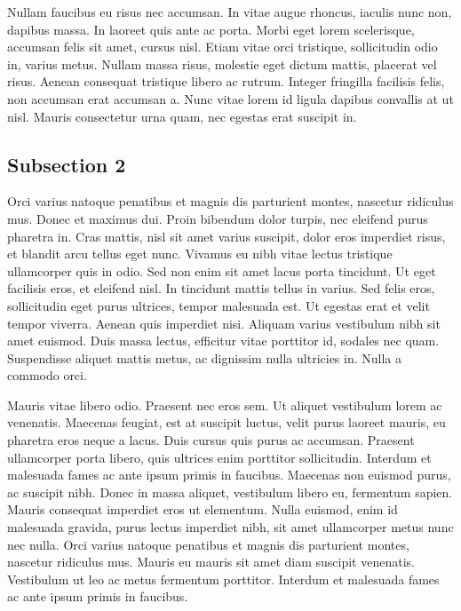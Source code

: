 Nullam faucibus eu risus nec accumsan. In vitae augue rhoncus, iaculis nunc non, dapibus massa. In laoreet quis ante ac porta. Morbi eget lorem scelerisque, accumsan felis sit amet, cursus nisl. Etiam vitae orci tristique, sollicitudin odio in, varius metus. Nullam massa risus, molestie eget dictum mattis, placerat vel risus. Aenean consequat tristique libero ac rutrum. Integer fringilla facilisis felis, non accumsan erat accumsan a. Nunc vitae lorem id ligula dapibus convallis at ut nisl. Mauris consectetur urna quam, nec egestas erat suscipit in.

\subsection{Subsection 2}

Orci varius natoque penatibus et magnis dis parturient montes, nascetur ridiculus mus. Donec et maximus dui. Proin bibendum dolor turpis, nec eleifend purus pharetra in. Cras mattis, nisl sit amet varius suscipit, dolor eros imperdiet risus, et blandit arcu tellus eget nunc. Vivamus eu nibh vitae lectus tristique ullamcorper quis in odio. Sed non enim sit amet lacus porta tincidunt. Ut eget facilisis eros, et eleifend nisl. In tincidunt mattis tellus in varius. Sed felis eros, sollicitudin eget purus ultrices, tempor malesuada est. Ut egestas erat et velit tempor viverra. Aenean quis imperdiet nisi. Aliquam varius vestibulum nibh sit amet euismod. Duis massa lectus, efficitur vitae porttitor id, sodales nec quam. Suspendisse aliquet mattis metus, ac dignissim nulla ultricies in. Nulla a commodo orci.

Mauris vitae libero odio. Praesent nec eros sem. Ut aliquet vestibulum lorem ac venenatis. Maecenas feugiat, est at suscipit luctus, velit purus laoreet mauris, eu pharetra eros neque a lacus. Duis cursus quis purus ac accumsan. Praesent ullamcorper porta libero, quis ultrices enim porttitor sollicitudin. Interdum et malesuada fames ac ante ipsum primis in faucibus. Maecenas non euismod purus, ac suscipit nibh. Donec in massa aliquet, vestibulum libero eu, fermentum sapien. Mauris consequat imperdiet eros ut elementum. Nulla euismod, enim id malesuada gravida, purus lectus imperdiet nibh, sit amet ullamcorper metus nunc nec nulla. Orci varius natoque penatibus et magnis dis parturient montes, nascetur ridiculus mus. Mauris eu mauris sit amet diam suscipit venenatis. Vestibulum ut leo ac metus fermentum porttitor. Interdum et malesuada fames ac ante ipsum primis in faucibus.

